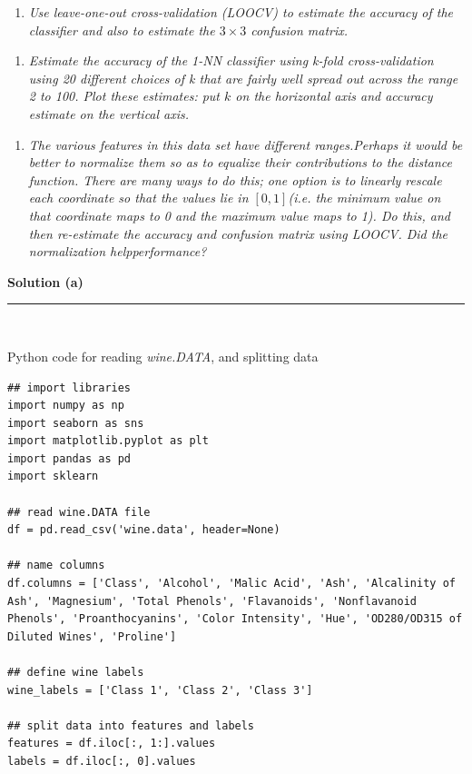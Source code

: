 \documentclass{article}
\begin{document}
\begin{enumerate}[label=(a)]
  \item \textit{Use leave-one-out cross-validation (LOOCV) to estimate the accuracy of the classifier and also
to estimate the $3 \times3$ confusion matrix.}
\end{enumerate}

\begin{enumerate}[label=(b)]
  \item \textit{Estimate the accuracy of the 1-NN classifier using k-fold cross-validation using 20 different choices
of k that are fairly well spread out across the range 2 to 100. Plot these estimates: put $k$ on the
horizontal axis and accuracy estimate on the vertical axis.}
\end{enumerate}

\begin{enumerate}[label=(c)]
  \item \textit{The various features in this data set have different ranges.Perhaps it would be better to normalize them so as to equalize their contributions to the distance function. There are many ways to do this; one option is to linearly rescale each coordinate so that the values lie in $[0,1]$(i.e. the minimum value on that coordinate maps to 0 and the maximum value maps to 1). Do this, and then re-estimate the accuracy and confusion matrix using LOOCV. Did the normalization helpperformance?}
\end{enumerate}

\textbf{Solution (a)}

\noindent\rule{\textwidth}{0.4pt}\\

\parbox{\textwidth}{Python code for reading \textit{wine.DATA}, and splitting data}

\begin{center}

\begin{lstlisting}
## import libraries
import numpy as np
import seaborn as sns
import matplotlib.pyplot as plt
import pandas as pd
import sklearn

## read wine.DATA file
df = pd.read_csv('wine.data', header=None)

## name columns
df.columns = ['Class', 'Alcohol', 'Malic Acid', 'Ash', 'Alcalinity of Ash', 'Magnesium', 'Total Phenols', 'Flavanoids', 'Nonflavanoid Phenols', 'Proanthocyanins', 'Color Intensity', 'Hue', 'OD280/OD315 of Diluted Wines', 'Proline']

## define wine labels
wine_labels = ['Class 1', 'Class 2', 'Class 3']

## split data into features and labels
features = df.iloc[:, 1:].values
labels = df.iloc[:, 0].values

\end{lstlisting}
    
\end{center}
\end{document}
